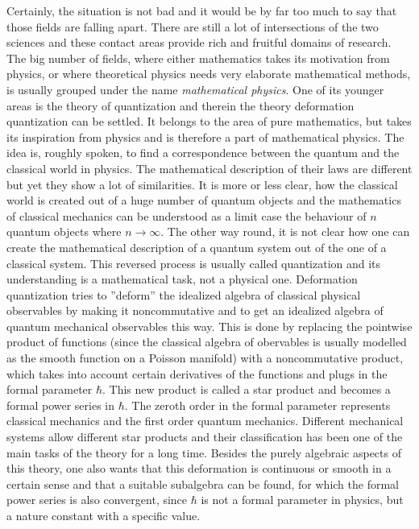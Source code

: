 Certainly, the situation is not bad and it would be by far too much to say that 
those fields are falling apart. There are still a lot of intersections of the 
two sciences and  these contact areas provide rich and fruitful 
domains of research. The big number of fields, where either mathematics takes 
its motivation from physics, or where theoretical physics needs very elaborate 
mathematical methods, is usually grouped under the name \emph{mathematical 
physics}. One of its younger areas is the theory of quantization and therein 
the theory deformation quantization can be settled. It belongs to the area of 
pure mathematics, but takes its inspiration from physics and is therefore a 
part of mathematical physics. The idea is, roughly spoken, to find a 
correspondence between the quantum and the classical world in physics. The 
mathematical description of their laws are different but yet they show a lot of 
similarities. It is more or less clear, how the classical world is created out 
of a huge number of quantum objects and the mathematics of classical mechanics 
can be understood as a limit case the behaviour of $n$ quantum objects where 
$n \longrightarrow \infty$. The other way round, it is not clear how one can 
create the mathematical description of a quantum system out of the one of a 
classical system. This reversed process is usually called quantization and its 
understanding is a mathematical task, not a physical one. Deformation 
quantization tries to ''deform'' the idealized algebra of classical physical 
observables by making it noncommutative and to get an idealized algebra of 
quantum mechanical observables this way. This is done by replacing the 
pointwise product of functions (since the classical algebra of obervables is 
usually modelled as the smooth function on a Poisson manifold) with a 
noncommutative product, which takes into account certain derivatives of the 
functions and plugs in the formal parameter $\hbar$. This new product is called 
a star product and becomes a formal power series in $\hbar$. The zeroth order 
in the formal parameter represents classical mechanics and the first order 
quantum mechanics. Different mechanical systems allow different star products 
and their classification has been one of the main tasks of the theory for a 
long time. Besides the purely algebraic aspects of this theory, one also wants 
that this deformation is continuous or smooth in a certain sense and that a 
suitable subalgebra can be found, for which the formal power series is also 
convergent, since $\hbar$ is not a formal parameter in physics, but a nature 
constant with a specific value.


